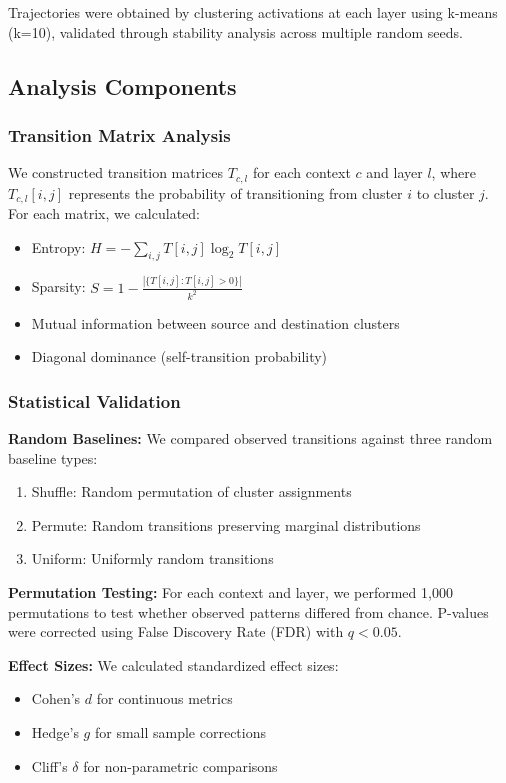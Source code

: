 Trajectories were obtained by clustering activations at each layer using k-means (k=10), validated through stability analysis across multiple random seeds.

\subsection{Analysis Components}

\subsubsection{Transition Matrix Analysis}
We constructed transition matrices $T_{c,l}$ for each context $c$ and layer $l$, where $T_{c,l}[i,j]$ represents the probability of transitioning from cluster $i$ to cluster $j$. For each matrix, we calculated:
\begin{itemize}
\item Entropy: $H = -\sum_{i,j} T[i,j] \log_2 T[i,j]$
\item Sparsity: $S = 1 - \frac{|\{T[i,j] : T[i,j] > 0\}|}{k^2}$
\item Mutual information between source and destination clusters
\item Diagonal dominance (self-transition probability)
\end{itemize}

\subsubsection{Statistical Validation}
\textbf{Random Baselines:} We compared observed transitions against three random baseline types:
\begin{enumerate}
\item Shuffle: Random permutation of cluster assignments
\item Permute: Random transitions preserving marginal distributions
\item Uniform: Uniformly random transitions
\end{enumerate}

\textbf{Permutation Testing:} For each context and layer, we performed 1,000 permutations to test whether observed patterns differed from chance. P-values were corrected using False Discovery Rate (FDR) with $q < 0.05$.

\textbf{Effect Sizes:} We calculated standardized effect sizes:
\begin{itemize}
\item Cohen's $d$ for continuous metrics
\item Hedge's $g$ for small sample corrections
\item Cliff's $\delta$ for non-parametric comparisons
\end{itemize}

